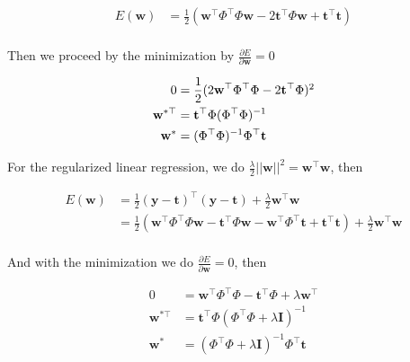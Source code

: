 \begin{appendices}
\begin{align*}
  E(\mathbf{w}) &= \frac{1}{2}(\mathbf{w}^\top \Phi^\top \Phi \mathbf{w}  - 2\mathbf{t}^\top \Phi \mathbf{w} + \mathbf{t}^\top \mathbf{t}) \nonumber \\
\end{align*}

Then we proceed by the minimization by $\frac{\partial E}{\partial \mathbf{w}} = 0$

\begin{align}
  0 &= \frac{1}{2}(2\mathbf{w}^\top \Phi^\top \Phi - 2\mathbf{t}^\top \Phi) \footnotemark[2] \nonumber \\
  \mathbf{w}^{*\top} &= \mathbf{t}^\top \Phi (\Phi^\top \Phi) ^{-1} \nonumber \\
  \mathbf{w}^{*} &= (\Phi^\top \Phi)^{-1}\Phi^\top \mathbf{t} 
\end{align}

For the regularized linear regression, we do $\frac{\lambda}{2} ||\mathbf{w}||^2 = \mathbf{w}^\top \mathbf{w}$, then

\begin{align*}
  E(\mathbf{w}) &= \frac{1}{2}(\mathbf{y} - \mathbf{t})^\top (\mathbf{y} - \mathbf{t}) + \frac{\lambda}{2} \mathbf{w}^\top \mathbf{w}\\
                &= \frac{1}{2}(\mathbf{w}^\top \Phi^\top \Phi \mathbf{w}  - \mathbf{t}^\top \Phi \mathbf{w} - \mathbf{w}^\top \Phi^\top \mathbf{t} + \mathbf{t}^\top \mathbf{t}) + \frac{\lambda}{2} \mathbf{w}^\top \mathbf{w} \nonumber \\
\end{align*}

And with the minimization we do $\frac{\partial E}{\partial \mathbf{w}} = 0$, then

\begin{align}
  0 &= \mathbf{w}^\top \Phi^\top \Phi - \mathbf{t}^\top \Phi + \lambda \mathbf{w}^\top\nonumber \\
  \mathbf{w}^{*\top} &= \mathbf{t}^\top \Phi (\Phi^\top \Phi + \lambda \mathbf{I}) ^{-1} \nonumber \\
  \mathbf{w}^{*} &= (\Phi^\top \Phi + \lambda \mathbf{I})^{-1}\Phi^\top \mathbf{t} 
\end{align}


\end{appendices}
